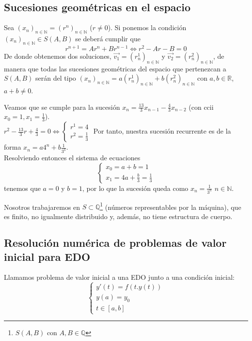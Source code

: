 \subsection{Sucesiones geométricas en el espacio}
Sea $(x_n)_{n\in\mathbb{N}} = (r^n)_{n\in\mathbb{N}}$ ($r \ne 0$). Si ponemos la condición $(x_n)_{n\in\mathbb{N}} \in S(A,B)$ se deberá cumplir que
$$
r^{n+1} = Ar^n + Br^{n-1} \iff r^2-Ar-B=0
$$
De donde obtenemos dos soluciones, $\overrightarrow{v_1} = (r^1_n)_{n\in\mathbb{N}}$ y $\overrightarrow{v_2} = (r^2_n)_{n\in\mathbb{N}}$, de manera que todas las sucesiones geométricas del espacio que pertenezcan a $S(A,B)$ serán del tipo $(x_n)_{n\in\mathbb{N}} = a(r^1_n)_{n\in\mathbb{N}} + b(r^2_n)_{n\in\mathbb{N}}$ con $a,b\in \mathbb{R}$, $a+b\ne 0$.
\begin{example}
Veamos que se cumple para la sucesión $x_n = \frac{13}{3}x_{n-1} - \frac{4}{3}x_{n-2}$ (con ccii $x_0 = 1, x_1 = \frac{1}{3}$).\\
$r^2-\frac{13}{3}r+\frac{4}{3} = 0 \iff 
\left\{\begin{matrix}
r^1 = 4 \\
r^2 = \frac{1}{3}
\end{matrix}\right.$
Por tanto, nuestra sucesión recurrente es de la forma $x_n = a4^n + b\frac{1}{3^3}$.\\

Resolviendo entonces el sistema de ecuaciones 
$$\left\{\begin{matrix}
x_0 = a+b = 1 \\
x_1 = 4a + \frac{b}{3} = \frac{1}{3}
\end{matrix}\right.$$
tenemos que $a=0$ y $b=1$, por lo que la sucesión queda como $x_n = \frac{1}{3^n}$ $n\in\mathbb{N}$.
\end{example}
Nosotros trabajaremos en $S\subset \mathbb{Q}$\footnote{$S(A,B)$ con $A,B\in \mathbb{Q}$} (números representables por la máquina), que es finito, no igualmente distribuido y, además, no tiene estructura de cuerpo.



\subsection{Resolución numérica de problemas de valor inicial para EDO}

\begin{definition}
    Llamamos problema de valor inicial a una EDO junto a una condición inicial:
\begin{equation} \label{eqn:pvi}
\begin{cases}
    y'(t)=f(t.y(t)) \\
    y(a) = y_0 \\
    t\in[a,b]
\end{cases}
\end{equation}
\end{definition}

